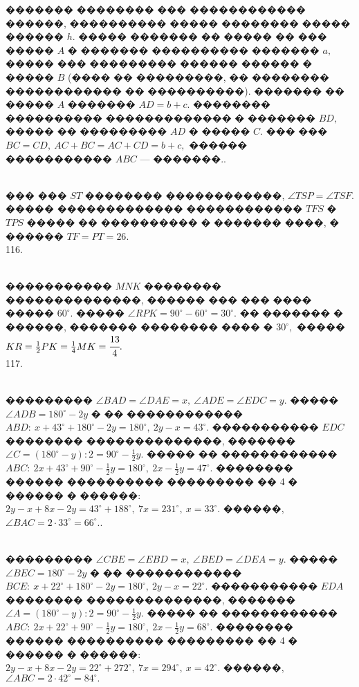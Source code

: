 \documentclass[12pt]{article}
\begin{document}
������� �������� ��� ������������ ������, ���������� ����� �������� ����� ������ $h.$ ����� ������� �� ����� �� ��� ����� $A$ � ������� ���������� ������� $a,$ ����� ��� ��������� ������ ������ � ����� $B$ (���� �� ���������, �� �������� ������������ �� ����������). ������� �� ����� $A$ ������� $AD=b+c.$ �������� ���������� ������������� � ������� $BD,$ ����� �� ��������� $AD$ � ����� $C.$ ��� ��� $BC=CD,\ AC+BC=AC+CD=b+c,$ ������ ����������� $ABC$ --- �������.\newpage{}. \begin{figure}[ht!]
\end{figure}\\
��� ��� $ST$ �������� ������������, $\angle TSP=\angle TSF.$ ����� ������������� ������������ $TFS$ � $TPS$ ����� �� ���������� � ������� ����, � ������ $TF=PT=26.$\\
116. \begin{figure}[ht!]
\end{figure}\\
����������� $MNK$ �������� ��������������, ������ ��� ��� ���� ����� $60^\circ.$ ����� $\angle RPK=90^\circ-60^\circ=30^\circ.$ �� ������� � ������, ������� �������� ���� � $30^\circ,$ ����� $KR=\frac{1}{2}PK=\frac{1}{4}MK=\cfrac{13}{4}.$\\
117. \begin{figure}[ht!]
\end{figure}\\
��������� $\angle BAD=\angle DAE=x,\ \angle ADE=\angle EDC=y.$ ����� $\angle ADB=180^\circ-2y$ � �� ������������ $ABD:\ x+43^\circ+180^\circ-2y=180^\circ,\ 2y-x=43^\circ.$ ����������� $EDC$ �������� ��������������, ������� $\angle C=(180^\circ-y):2=90^\circ-\frac{1}{2}y.$ ����� �� ������������ $ABC:\ 2x+43^\circ+90^\circ-\frac{1}{2}y=180^\circ,\ 2x-\frac{1}{2}y=47^\circ.$ �������� ������ ���������� ��������� �� 4 � ������ � ������: $2y-x+8x-2y=43^\circ+188^\circ,\ 7x=231^\circ,\ x=33^\circ.$ ������, $\angle BAC=2\cdot33^\circ=66^\circ.$\newpage{}.\begin{figure}[ht!]
\end{figure}\\
��������� $\angle CBE=\angle EBD=x,\ \angle BED=\angle DEA=y.$ ����� $\angle BEC=180^\circ-2y$ � �� ������������ $BCE:\ x+22^\circ+180^\circ-2y=180^\circ,\ 2y-x=22^\circ.$ ����������� $EDA$ �������� ��������������, ������� $\angle A=(180^\circ-y):2=90^\circ-\frac{1}{2}y.$ ����� �� ������������ $ABC:\ 2x+22^\circ+90^\circ-\frac{1}{2}y=180^\circ,\ 2x-\frac{1}{2}y=68^\circ.$ �������� ������ ���������� ��������� �� 4 � ������ � ������: $2y-x+8x-2y=22^\circ+272^\circ,\ 7x=294^\circ,\ x=42^\circ.$ ������, $\angle ABC=2\cdot42^\circ=84^\circ.$\\
\end{document}
